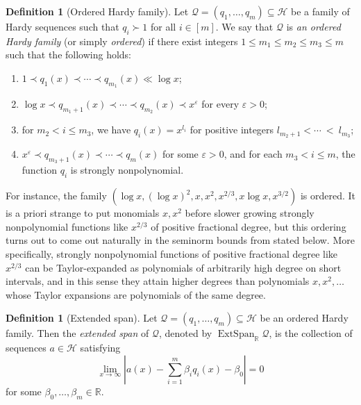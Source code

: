 \documentclass[11pt]{amsart}
\theoremstyle{definition}
\newtheorem{definition}[lemma]{Definition}
\newcommand{\N}{{\mathbb N}}
\newcommand{\R}{{\mathbb R}}
\newcommand{\CH}{{\mathcal H}}
\newcommand{\CQ}{{\mathcal Q}}
\newcommand{\veps}{\varepsilon}
\newcommand{\1}{{\mathbf{1}}}
\DeclareMathOperator{\extspan}{ExtSpan}
\newcommand{\abs}[1]{\mathopen{}\left| #1\mathclose{}\right|}
\begin{document}
\begin{definition}[Ordered Hardy family]\label{D: ordered Hardy family}
    Let $\CQ = (q_1, \ldots, q_m)\subseteq\CH$ be a family of Hardy sequences such that $q_i\succ 1$ for all $i\in[m]$. We say that $\CQ$ is \textit{an ordered Hardy family} (or simply \textit{ordered}) if there exist integers $1\leq m_1\leq m_2\leq m_3\leq m$ such that the following holds:
        \begin{enumerate}
            \item $1\prec q_1(x) \prec \cdots \prec q_{m_1}(x)\ll\log x$;
            \item $\log x\prec q_{m_1+1}(x) \prec \cdots \prec q_{m_2}(x) \prec x^\veps$ for every $\veps>0$;
            \item for $m_2 < i \leq m_3$, we have $q_i(x) = x^{l_i}$ for positive integers $l_{m_2+1}< \cdots~<~l_{m_3}$;
            \item $x^\veps \prec q_{m_3+1}(x) \prec \cdots \prec q_m(x)$ for some $\veps>0$, and for each $m_3 < i\leq m$, the function $q_i$ is strongly nonpolynomial.
        \end{enumerate}    
\end{definition}
For instance, the family $(\log x, (\log x)^2, x, x^2, x^{2/3}, x\log x, x^{3/2})$ is ordered. It is a priori strange to put monomials $x, x^2$ before slower growing strongly nonpolynomial functions like $x^{2/3}$ of positive fractional degree, but this ordering turns out to come out naturally in the seminorm bounds from \cite{DKKST24} stated below. More specifically, strongly nonpolynomial functions of positive fractional degree like $x^{2/3}$ can be Taylor-expanded as polynomials of arbitrarily high degree on short intervals, and in this sense they attain higher degrees than polynomials $x, x^2, \ldots$ whose Taylor expansions are polynomials of the same degree.
\begin{definition}[Extended span]
    Let $\CQ = (q_1, \ldots, q_m)\subseteq\CH$ be an ordered Hardy family. Then the \textit{extended span} of $\CQ$, denoted by $\extspan_\R\CQ$, is the collection of sequences $a\in\CH$ satisfying
    $$\lim_{x\to\infty}\abs{a(x) - \sum\limits_{i=1}^m \beta_i q_i(x) - \beta_0} = {0}$$ for some $\beta_0, \ldots,\beta_m\in\R$.
\end{definition}

 
\end{document}
